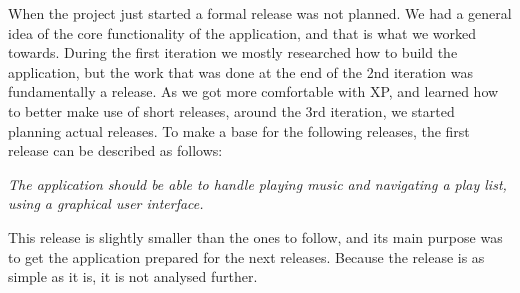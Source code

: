 When the project just started a formal release was not planned. We had a general idea of the core functionality of the application, and that is what we worked towards. During the first iteration we mostly researched how to build the application, but the work that was done at the end of the 2nd iteration was fundamentally a release. As we got more comfortable with XP, and learned how to better make use of short releases, around the 3rd iteration, we started planning actual releases. To make a base for the following releases, the first release can be described as follows:

\textit{The application should be able to handle playing music and navigating a play list, using a graphical user interface.}

This release is slightly smaller than the ones to follow, and its main purpose was to get the application prepared for the next releases. Because the release is as simple as it is, it is not analysed further.